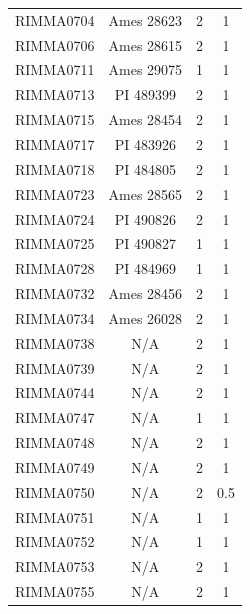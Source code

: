 \documentclass[11pt]{article}
\newcounter{rowno}
\begin{document}
\begin{scriptsize}
\begin{longtable}{>{\stepcounter{rowno}}cccc}
    RIMMA0704 & Ames	28623 & 2     & 1 \\
    RIMMA0706 & Ames	28615 & 2     & 1 \\
    RIMMA0711 & Ames	29075 & 1     & 1 \\
    RIMMA0713 & PI	489399 & 2     & 1 \\
    RIMMA0715 & Ames	28454 & 2     & 1 \\
    RIMMA0717 & PI	483926 & 2     & 1 \\
    RIMMA0718 & PI	484805 & 2     & 1 \\
    RIMMA0723 & Ames	28565 & 2     & 1 \\
    RIMMA0724 & PI	490826& 2     & 1 \\
    RIMMA0725 & PI	490827 & 1     & 1 \\
    RIMMA0728 & PI	484969 & 1     & 1 \\
    RIMMA0732 & Ames 28456 & 2     & 1 \\
    RIMMA0734 & Ames 26028 & 2     & 1 \\
    RIMMA0738 & N/A & 2     & 1 \\
    RIMMA0739 & N/A & 2     & 1 \\
    RIMMA0744 & N/A & 2     & 1 \\
    RIMMA0747 & N/A & 1     & 1 \\
    RIMMA0748 & N/A & 2     & 1 \\
    RIMMA0749 & N/A & 2     & 1 \\
    RIMMA0750 & N/A & 2     & 0.5 \\
    RIMMA0751 & N/A & 1     & 1 \\
    RIMMA0752 & N/A & 1     & 1 \\
    RIMMA0753 & N/A & 2     & 1 \\
    RIMMA0755 & N/A & 2     & 1 \\
    \hline
\end{longtable}
\end{scriptsize}

\clearpage

\end{document}
